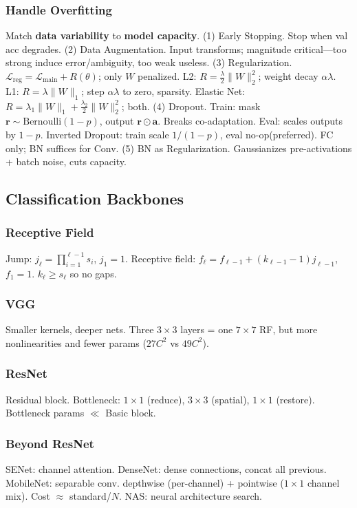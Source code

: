 \subsubsection*{Handle Overfitting}
Match \textbf{data variability} to \textbf{model capacity}.
(1) Early Stopping. Stop when val acc degrades.
(2) Data Augmentation. Input transforms; magnitude critical—too strong induce error/ambiguity, too weak useless.
(3) Regularization. $\mathcal{L}_{\text{reg}}=\mathcal{L}_{\text{main}}+R(\theta)$; only $W$ penalized.
L2: $R=\frac{\lambda}{2}\|W\|_2^2$; weight decay $\alpha\lambda$.
L1: $R=\lambda\|W\|_1$; step $\alpha\lambda$ to zero, sparsity.
Elastic Net: $R=\lambda_1\|W\|_1+\frac{\lambda_2}{2}\|W\|_2^2$; both.
(4) Dropout.
Train: mask $\mathbf{r}\sim\text{Bernoulli}(1-p)$, output $\mathbf{r}\odot\mathbf{a}$. Breaks co-adaptation.
Eval: scales outputs by $1-p$.
Inverted Dropout: train scale $1/(1-p)$, eval no-op(preferred).
FC only; BN suffices for Conv.
(5) BN as Regularization. Gaussianizes pre-activations + batch noise, cuts capacity.

\subsection{Classification Backbones}
\subsubsection*{Receptive Field}
Jump: $j_\ell=\prod_{i=1}^{\ell-1}s_i$, $j_1=1$.
Receptive field: $f_\ell=f_{\ell-1}+(k_{\ell-1}-1)j_{\ell-1}$, $f_1=1$.
$k_\ell\ge s_\ell$ so no gaps.

\subsubsection*{VGG}
Smaller kernels, deeper nets. Three $3\times3$ layers = one $7\times7$ RF, but more nonlinearities and fewer params ($27C^2$ vs $49C^2$).

\subsubsection*{ResNet}
Residual block.
Bottleneck: $1\times1$ (reduce), $3\times3$ (spatial), $1\times1$ (restore). Bottleneck params $\ll$ Basic block.

\subsubsection*{Beyond ResNet}
SENet: channel attention. DenseNet: dense connections, concat all previous.
MobileNet: separable conv. depthwise (per-channel) + pointwise ($1\times1$ channel mix). Cost $\approx$ standard/$N$.
NAS: neural architecture search.
